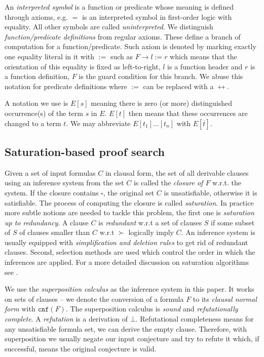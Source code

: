An \textit{interpreted symbol} is a function or predicate whose meaning is defined through axioms, e.g. $=$ is an interpreted symbol in first-order logic with equality. All other symbols are called \textit{uninterpreted}. We distinguish \textit{function/predicate definitions} from regular axioms. These define a branch of computation for a function/predicate. Such axiom is denoted by marking exactly one equality literal in it with $:=$ such as $F\rightarrow l:=r$ which means that the orientation of this equality is fixed as left-to-right, $l$ is a function header and $r$ is a function definition, $F$ is the guard condition for this branch. We abuse this notation for predicate definitions where $:=$ can be replaced with a $\leftrightarrow$.

A notation we use is $E[s]$ meaning there is zero  (or more) distinguished occurrence(s) of the term $s$ in $E$. $E[t]$ then means that these occurrences are changed to a term $t$. We may abbreviate $E[t_1]...[t_n]$ with $E[\overline{t}]$.

\subsection{Saturation-based proof search}
Given a set of input formulas $C$ in clausal form, the set of all derivable clauses using an inference system from the set $C$ is called the \textit{closure of $F$} w.r.t. the system. If the closure contains $\square$, the original set $C$ is unsatisfiable, otherwise it is satisfiable. The process of computing the closure is called \textit{saturation}. In practice more subtle notions are needed to tackle this problem, the first one is \textit{saturation up to redundancy}. A clause $C$ is \textit{redundant} w.r.t a set of clauses $S$ if some subset of $S$ of clauses smaller than $C$ w.r.t $\succ$ logically imply $C$. An inference system is usually equipped with \textit{simplification and deletion rules} to get rid of redundant clauses. Second, selection methods are used which control the order in which the inferences are applied. For a more detailed discussion on saturation algorithms see \cite{cav13}.

We use the \textit{superposition calculus} as the inference system in this paper. It works on sets of clauses -- we denote the conversion of a formula $F$ to its \textit{clausal normal form} with $\mathtt{cnf}(F)$. The superposition calculus is \textit{sound} and \textit{refutationally complete}. A \textit{refutation} is a derivation of $\bot$. Refutational completeness means for any unsatisfiable formula set, we can derive the empty clause. Therefore, with superposition we usually negate our input conjecture and try to refute it which, if successful, means the original conjecture is valid.

